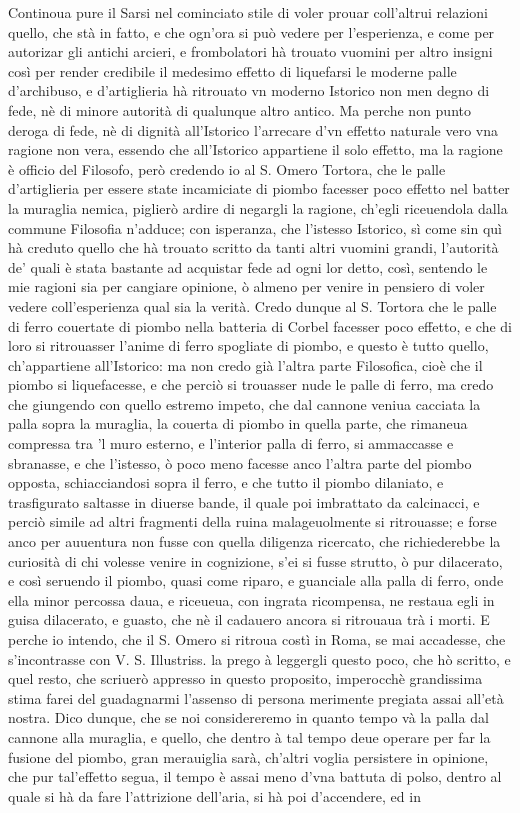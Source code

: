 \documentclass[11pt,twoside,openany]{book}
\begin{document}
Continoua pure il Sarsi nel cominciato stile di voler prouar coll'altrui relazioni quello, che stà in fatto, e che ogn'ora si può vedere per l'esperienza, e come per autorizar gli antichi arcieri, e frombolatori hà trouato vuomini per altro insigni così per render credibile il medesimo effetto di liquefarsi le moderne palle d'archibuso, e d'artiglieria hà ritrouato vn moderno Istorico non men degno di fede, nè di minore autorità di qualunque altro antico. Ma perche non punto deroga di fede, nè di dignità all'Istorico l'arrecare d'vn effetto naturale vero vna ragione non vera, essendo che all'Istorico appartiene il solo effetto, ma la ragione è officio del Filosofo, però credendo io al S. Omero Tortora, che le palle d'artiglieria per essere state incamiciate di piombo facesser poco effetto nel batter la muraglia nemica, piglierò ardire di negargli la ragione, ch'egli riceuendola dalla commune Filosofia n'adduce; con isperanza, che l'istesso Istorico, sì come sin quì hà creduto quello che hà trouato scritto da tanti altri vuomini grandi, l'autorità de' quali è stata bastante ad acquistar fede ad ogni lor detto, così, sentendo le mie ragioni sia per cangiare opinione, ò almeno per venire in pensiero di voler vedere coll'esperienza qual sia la verità. Credo dunque al S. Tortora che le palle di ferro couertate di piombo nella batteria di Corbel facesser poco effetto, e che di loro si ritrouasser l'anime di ferro spogliate di piombo, e questo è tutto quello, ch'appartiene all'Istorico: ma non credo già l'altra parte Filosofica, cioè che il piombo si liquefacesse, e che perciò si trouasser nude le palle di ferro, ma credo che giungendo con quello estremo impeto, che dal cannone veniua cacciata la palla sopra la muraglia, la couerta di piombo in quella parte, che rimaneua compressa tra 'l muro esterno, e l'interior palla di ferro, si ammaccasse e sbranasse, e che l'istesso, ò poco meno facesse anco l'altra parte del piombo opposta, schiacciandosi sopra il ferro, e che tutto il piombo dilaniato, e trasfigurato saltasse in diuerse bande, il quale poi imbrattato da calcinacci, e perciò simile ad altri fragmenti della ruina malageuolmente si ritrouasse; e forse anco per auuentura non fusse con quella diligenza ricercato, che richiederebbe la curiosità di chi volesse venire in cognizione, s'ei si fusse strutto, ò pur dilacerato, e così seruendo il piombo, quasi come riparo, e guanciale alla palla di ferro, onde ella minor percossa daua, e riceueua, con ingrata ricompensa, ne restaua egli in guisa dilacerato, e guasto, che nè il cadauero ancora si ritrouaua trà i morti. E perche io intendo, che il S. Omero si ritroua costì in Roma, se mai accadesse, che s'incontrasse con V. S. Illustriss. la prego à leggergli questo poco, che hò scritto, e quel resto, che scriuerò appresso in questo proposito, imperocchè grandissima stima farei del guadagnarmi l'assenso di persona merimente pregiata assai all'età nostra. Dico dunque, che se noi considereremo in quanto tempo và la palla dal cannone alla muraglia, e quello, che dentro à tal tempo deue operare per far la fusione del piombo, gran merauiglia sarà, ch'altri voglia persistere in opinione, che pur tal'effetto segua, il tempo è assai meno d'vna battuta di polso, dentro al quale si hà da fare l'attrizione dell'aria, si hà poi d'accendere, ed in 
\end{document}
